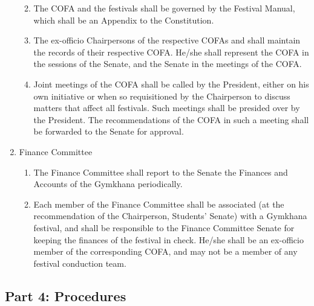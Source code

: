 \begin{enumerate}
  \begin{enumerate}
  \def\labelenumii{\alph{enumii}.}
  \item
    The COFA and the festivals shall be governed by the Festival Manual,
    which shall be an Appendix to the Constitution.
  \item
    The ex-officio Chairpersons of the respective COFAs and shall
    maintain the records of their respective COFA. He/she shall
    represent the COFA in the sessions of the Senate, and the Senate in
    the meetings of the COFA.
  \item
    Joint meetings of the COFA shall be called by the President, either
    on his own initiative or when so requisitioned by the Chairperson to
    discuss matters that affect all festivals. Such meetings shall be
    presided over by the President. The recommendations of the COFA in
    such a meeting shall be forwarded to the Senate for approval.
  \end{enumerate}
\item
  Finance Committee

  \begin{enumerate}
  \def\labelenumii{\alph{enumii}.}
  \item
    The Finance Committee shall report to the Senate the Finances and
    Accounts of the Gymkhana periodically.
  \item
    Each member of the Finance Committee shall be associated (at the
    recommendation of the Chairperson, Students' Senate) with a Gymkhana
    festival, and shall be responsible to the Finance Committee Senate
    for keeping the finances of the festival in check. He/she shall be
    an ex-officio member of the corresponding COFA, and may not be a
    member of any festival conduction team.
  \end{enumerate}
\end{enumerate}

\subsection{Part 4: Procedures}\label{part-4-procedures}


